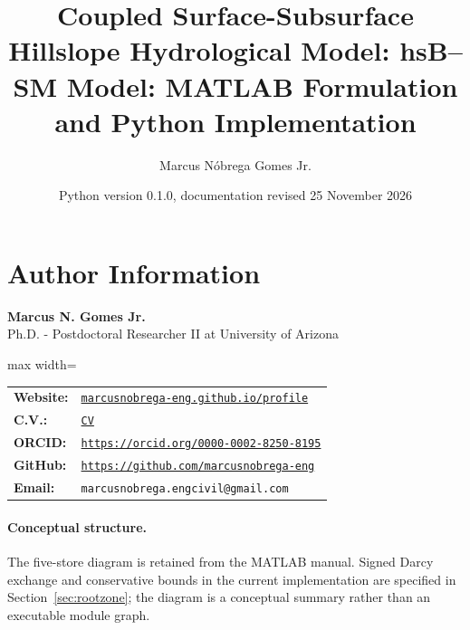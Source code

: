 \documentclass[12pt]{article}
\title{\textbf{Coupled Surface-Subsurface Hillslope Hydrological Model: hsB--SM Model: MATLAB Formulation and Python Implementation}}
\author{Marcus Nóbrega Gomes Jr.}
\date{Python version 0.1.0, documentation revised 25 November 2026}
\begin{document}
\maketitle
\tableofcontents
\newpage

\section*{Author Information}

\textbf{Marcus N. Gomes Jr.} \\
Ph.D. - Postdoctoral Researcher II at University of Arizona \\

\vspace{0.5em}

\begin{adjustbox}{max width=\linewidth}\begin{tabular}{ll}
\textbf{Website:} & \href{https://marcusnobrega-eng.github.io/profile/}{\texttt{marcusnobrega-eng.github.io/profile}} \\
\textbf{C.V.:} & \href{https://marcusnobrega-eng.github.io/profile//files/CV___Marcus_N__Gomes_Jr_.pdf}{\texttt{CV}} \\
\textbf{ORCID:} & \href{https://orcid.org/0000-0002-8250-8195}{\texttt{https://orcid.org/0000-0002-8250-8195}} \\
\textbf{GitHub:} & \href{https://github.com/marcusnobrega-eng}{\texttt{https://github.com/marcusnobrega-eng}} \\
\textbf{Email:} & \texttt{marcusnobrega.engcivil@gmail.com}
\end{tabular}\end{adjustbox}

\newpage


\newpage
\paragraph{Conceptual structure.}
The five-store diagram is retained from the MATLAB manual. Signed Darcy exchange and conservative bounds in the current implementation are specified in Section~\ref{sec:rootzone}; the diagram is a conceptual summary rather than an executable module graph.
\end{document}
